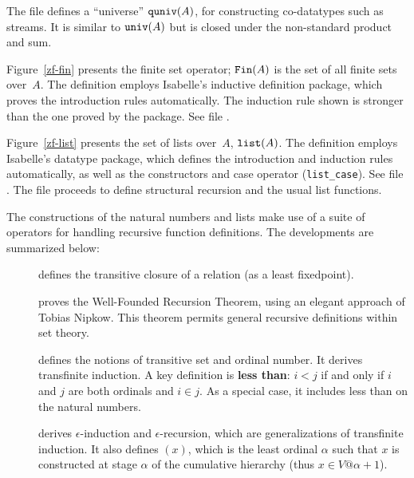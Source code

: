 The file  defines a ``universe'' ${\tt quniv}(A)$,
for constructing co-datatypes such as streams.  It is similar to ${\tt
  univ}(A)$ but is closed under the non-standard product and sum.

Figure~\ref{zf-fin} presents the finite set operator; ${\tt Fin}(A)$ is the
set of all finite sets over~$A$.  The definition employs Isabelle's
inductive definition package, which proves the introduction rules
automatically.  The induction rule shown is stronger than the one proved by
the package.  See file .

Figure~\ref{zf-list} presents the set of lists over~$A$, ${\tt list}(A)$.
The definition employs Isabelle's datatype package, which defines the
introduction and induction rules automatically, as well as the constructors
and case operator (\verb|list_case|).  See file .
The file  proceeds to define structural
recursion and the usual list functions.

The constructions of the natural numbers and lists make use of a suite of
operators for handling recursive function definitions.  The developments are
summarized below:
\begin{description}
\item[]
defines the transitive closure of a relation (as a least fixedpoint).

\item[]
proves the Well-Founded Recursion Theorem, using an elegant
approach of Tobias Nipkow.  This theorem permits general recursive
definitions within set theory.

\item[] defines the notions of transitive set and
  ordinal number.  It derives transfinite induction.  A key definition is
  {\bf less than}: $i<j$ if and only if $i$ and $j$ are both ordinals and
  $i\in j$.  As a special case, it includes less than on the natural
  numbers.

\item[]
derives $\epsilon$-induction and $\epsilon$-recursion, which are
generalizations of transfinite induction.  It also defines
$(x)$, which is the least ordinal $\alpha$ such that $x$
is constructed at stage $\alpha$ of the cumulative hierarchy (thus $x\in
V@{\alpha+1}$).
\end{description}


